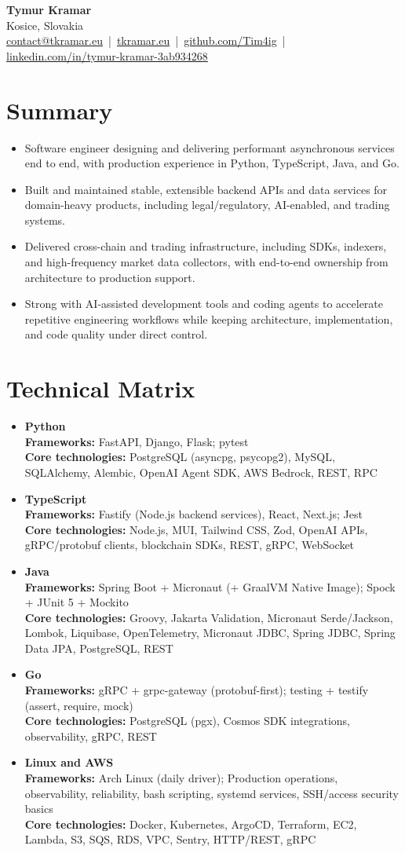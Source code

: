 \documentclass[11pt,a4paper]{article}
\newcommand{\skillentry}[5]{
  \item \textbf{#1} \\
  \textbf{Frameworks:} #2; #3 \\
  \textbf{Core technologies:} #4, #5
}
\begin{document}
{\LARGE \textbf{Tymur Kramar}} \\
Kosice, Slovakia \\
\href{mailto:contact@tkramar.eu}{contact@tkramar.eu} \,|\, \href{https://tkramar.eu}{tkramar.eu} \,|\, \href{https://github.com/Tim4ig}{github.com/Tim4ig} \,|\, \href{https://www.linkedin.com/in/tymur-kramar-3ab934268/}{linkedin.com/in/tymur-kramar-3ab934268}

\section*{Summary}
\begin{itemize}[itemsep=0.08em,topsep=0.08em]
  \item Software engineer designing and delivering performant asynchronous services end to end, with production experience in Python, TypeScript, Java, and Go.
  \item Built and maintained stable, extensible backend APIs and data services for domain-heavy products, including legal/regulatory, AI-enabled, and trading systems.
  \item Delivered cross-chain and trading infrastructure, including SDKs, indexers, and high-frequency market data collectors, with end-to-end ownership from architecture to production support.
  \item Strong with AI-assisted development tools and coding agents to accelerate repetitive engineering workflows while keeping architecture, implementation, and code quality under direct control.
\end{itemize}

\section*{Technical Matrix}
\begin{itemize}[itemsep=0.06em,topsep=0.06em]
  \skillentry
    {Python}
    {FastAPI, Django, Flask}
    {pytest}
    {PostgreSQL (asyncpg, psycopg2), MySQL, SQLAlchemy, Alembic, OpenAI Agent SDK, AWS Bedrock}
    {REST, RPC}

  \skillentry
    {TypeScript}
    {Fastify (Node.js backend services), React, Next.js}
    {Jest}
    {Node.js, MUI, Tailwind CSS, Zod, OpenAI APIs, gRPC/protobuf clients, blockchain SDKs}
    {REST, gRPC, WebSocket}

  \skillentry
    {Java}
    {Spring Boot + Micronaut (+ GraalVM Native Image)}
    {Spock + JUnit 5 + Mockito}
    {Groovy, Jakarta Validation, Micronaut Serde/Jackson, Lombok, Liquibase, OpenTelemetry}
    {Micronaut JDBC, Spring JDBC, Spring Data JPA, PostgreSQL, REST}

  \skillentry
    {Go}
    {gRPC + grpc-gateway (protobuf-first)}
    {testing + testify (assert, require, mock)}
    {PostgreSQL (pgx), Cosmos SDK integrations, observability}
    {gRPC, REST}

  \skillentry
    {Linux and AWS}
    {Arch Linux (daily driver)}
    {Production operations, observability, reliability, bash scripting, systemd services, SSH/access security basics}
    {Docker, Kubernetes, ArgoCD, Terraform, EC2, Lambda, S3, SQS, RDS, VPC, Sentry}
    {HTTP/REST, gRPC}
\end{itemize}
\end{document}
